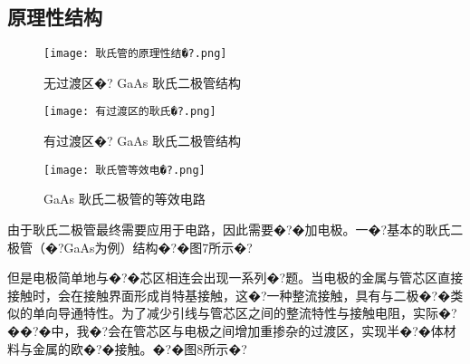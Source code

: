 \documentclass{zjureport}
\begin{document}
%
%


 
\subsection{原理性结构}
\begin{figure}[htbp]
	\centering
	\texttt{[image: 耿氏管的原理性结�?.png]}
	\caption{无过渡区�? GaAs 耿氏二极管结构}
\end{figure}
\begin{figure}[htbp]
	\centering
	\texttt{[image: 有过渡区的耿氏�?.png]}
	\caption{有过渡区�? GaAs 耿氏二极管结构}
\end{figure}
\begin{figure}[htbp]
	\centering
	\texttt{[image: 耿氏管等效电�?.png]}
	\caption{GaAs 耿氏二极管的等效电路}
\end{figure}
由于耿氏二极管最终需要应用于电路，因此需要�?�加电极。一�?基本的耿氏二极管（�?GaAs为例）结构�?�图7所示�?


但是电极简单地与�?�芯区相连会出现一系列�?题。当电极的金属与管芯区直接接触时，会在接触界面形成肖特基接触，这�?一种整流接触，具有与二极�?�类似的单向导通特性。为了减少引线与管芯区之间的整流特性与接触电阻，实际�?��?�中，我�?会在管芯区与电极之间增加重掺杂的过渡区，实现半�?�体材料与金属的欧�?�接触。�?�图8所示�?
\end{document}
